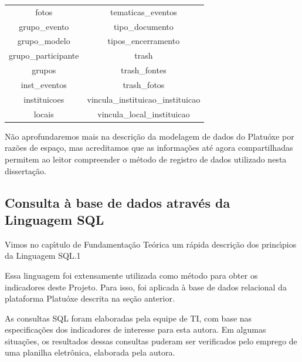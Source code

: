 \documentclass[
12pt,		%
openright,	%
twoside,  %
a4paper,			%
chapter=TITLE,		%
english,			%
french,				%
spanish,			%
brazil				%
]{USPSC-classe/USPSC}
\begin{document}
\begin{table}[htb]
\begin{tabular}{|c|c|}
 fotos                          &   tematicas\_eventos \\
 grupo\_evento                   &   tipo\_documento \\
 grupo\_modelo                   &   tipos\_encerramento \\
 grupo\_participante             &   trash \\
 grupos                         &   trash\_fontes \\
 inst\_eventos                   &   trash\_fotos \\
 instituicoes                   &   vincula\_instituicao\_instituicao \\
 locais                         &   vincula\_local\_instituicao \\
\hline
\end{tabular}
\end{table}


N\~ao aprofundaremos mais na descri\c{c}\~ao da modelagem de dados do Platu\'oxe por raz\~oes de espa\c{c}o, mas acreditamos que as informa\c{c}\~oes at\'e agora compartilhadas permitem ao leitor compreender o m\'etodo de registro de dados utilizado nesta disserta\c{c}\~ao.









\subsection[Consulta \`a base de dados atrav\'es da Linguagem SQL]{Consulta \`a base de dados atrav\'es da Linguagem SQL}\label{Consulta \`a base de dados atrav\'es da Linguagem SQL}
Vimos no cap\'{\i}tulo de Fundamenta\c{c}\~ao Te\'orica um r\'apida descri\c{c}\~ao dos princ\'{\i}pios da Linguagem SQL.1









Essa linguagem foi extensamente utilizada como m\'etodo para obter os indicadores deste Projeto. Para isso, foi aplicada \`a base de dados relacional da plataforma Platu\'oxe descrita na se\c{c}\~ao anterior.









As consultas SQL foram elaboradas pela equipe de TI, com base nas especifica\c{c}\~oes dos indicadores de interesse para esta autora. Em algumas situa\c{c}\~oes, os resultados dessas consultas puderam ser verificados pelo emprego de uma planilha eletr\^onica, elaborada pela autora.
\end{document}
